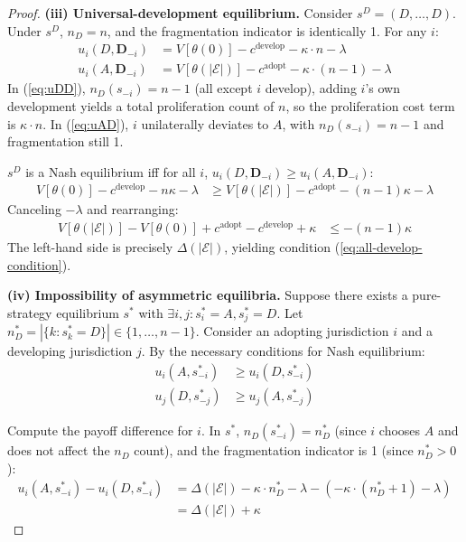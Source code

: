 \documentclass[12pt,a4paper]{article}
\theoremstyle{definition}
\theoremstyle{remark}
\begin{document}
\begin{proof}
\textbf{(iii) Universal-development equilibrium.} Consider $s^{D} = (D, \ldots, D)$. Under $s^{D}$, $n_D = n$, and the fragmentation indicator is identically 1. For any $i$:
\begin{align}
u_i(D, \mathbf{D}_{-i}) &= V[\theta(0)] - c^{\text{develop}} - \kappa \cdot n - \lambda \label{eq:uDD}\\
u_i(A, \mathbf{D}_{-i}) &= V[\theta(|\mathcal{E}|)] - c^{\text{adopt}} - \kappa \cdot (n-1) - \lambda \label{eq:uAD}
\end{align}
In (\ref{eq:uDD}), $n_D(s_{-i}) = n-1$ (all except $i$ develop), adding $i$'s own development yields a total proliferation count of $n$, so the proliferation cost term is $\kappa \cdot n$. In (\ref{eq:uAD}), $i$ unilaterally deviates to $A$, with $n_D(s_{-i}) = n-1$ and fragmentation still 1.

$s^{D}$ is a Nash equilibrium iff for all $i$, $u_i(D, \mathbf{D}_{-i}) \geq u_i(A, \mathbf{D}_{-i})$:
\begin{align}
V[\theta(0)] - c^{\text{develop}} - n\kappa - \lambda &\geq V[\theta(|\mathcal{E}|)] - c^{\text{adopt}} - (n-1)\kappa - \lambda
\end{align}
Canceling $-\lambda$ and rearranging:
\begin{align}
V[\theta(|\mathcal{E}|)] - V[\theta(0)] + c^{\text{adopt}} - c^{\text{develop}} + \kappa &\leq -(n-1)\kappa
\end{align}
The left-hand side is precisely $\Delta(|\mathcal{E}|)$, yielding condition (\ref{eq:all-develop-condition}).

\textbf{(iv) Impossibility of asymmetric equilibria.} Suppose there exists a pure-strategy equilibrium $s^*$ with $\exists i, j: s_i^* = A, s_j^* = D$. Let $n_D^* = |\{k: s_k^* = D\}| \in \{1, \ldots, n-1\}$. Consider an adopting jurisdiction $i$ and a developing jurisdiction $j$. By the necessary conditions for Nash equilibrium:
\begin{align}
u_i(A, s_{-i}^*) &\geq u_i(D, s_{-i}^*) \label{eq:condA}\\
u_j(D, s_{-j}^*) &\geq u_j(A, s_{-j}^*) \label{eq:condD}
\end{align}

Compute the payoff difference for $i$. In $s^*$, $n_D(s_{-i}^*) = n_D^*$ (since $i$ chooses $A$ and does not affect the $n_D$ count), and the fragmentation indicator is 1 (since $n_D^* > 0$):
\begin{align}
u_i(A, s_{-i}^*) - u_i(D, s_{-i}^*) &= \Delta(|\mathcal{E}|) - \kappa \cdot n_D^* - \lambda - (-\kappa \cdot (n_D^* + 1) - \lambda) \nonumber\\
&= \Delta(|\mathcal{E}|) + \kappa
\end{align}


\end{proof}
\end{document}
